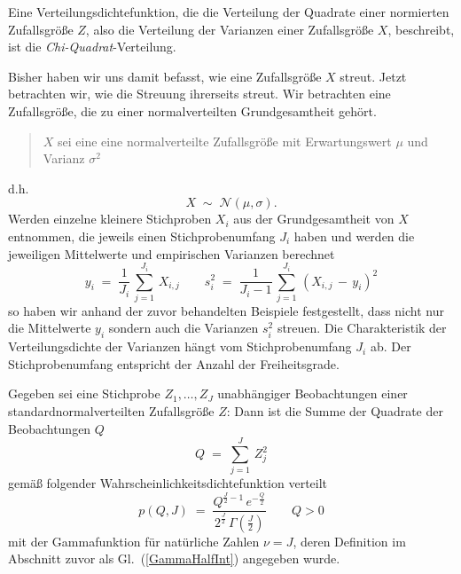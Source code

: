 Eine Verteilungsdichtefunktion, die die Verteilung der Quadrate einer
 normierten Zufallsgröße $Z$,
also die Verteilung der Varianzen einer Zufallsgröße $X$, beschreibt, ist die 
\textsl{Chi-Quadrat}-Verteilung.


Bisher haben wir uns damit befasst, wie eine Zufallsgröße $X$ streut.
Jetzt betrachten wir, wie die Streuung ihrerseits streut.
Wir betrachten eine Zufallsgröße, die zu einer normalverteilten Grundgesamtheit gehört.
\begin{quote}
$X$ sei eine eine normalverteilte Zufallsgröße mit Erwartungswert $\mu$ und Varianz $\sigma^2$
\end{quote}
d.h.
\begin{equation}
X \; \sim \; \mathcal{N}(\mu, \sigma).
\end{equation}
Werden einzelne kleinere Stichproben $X_i$ aus der Grundgesamtheit von $X$ entnommen, die
jeweils einen Stichprobenumfang $J_i$ haben und werden die jeweiligen Mittelwerte und
empirischen Varianzen berechnet
\begin{equation}
y_i \; = \; \frac{1}{J_i} \, \sum_{j=1}^{J_i} \, X_{i,j} \qquad
 s_i^2 \; = \; \frac{1}{J_i-1} \, \sum_{j=1}^{J_i} \, (X_{i,j} \, - \, y_i)^2
\end{equation}
so haben wir anhand der zuvor behandelten Beispiele festgestellt,
dass nicht nur die Mittelwerte $y_i$ sondern auch die Varianzen $s_i^2$ streuen.
Die Charakteristik der Verteilungsdichte der Varianzen hängt vom
Stichprobenumfang $J_i$ ab. Der Stichprobenumfang entspricht der Anzahl der Freiheitsgrade.

Gegeben sei eine Stichprobe $Z_1, \dots, Z_J$ unabhängiger Beobachtungen einer
standardnormalverteilten Zufallsgröße $Z$:
Dann ist die Summe der Quadrate der Beobachtungen $Q$ 
\begin{equation}
Q \; = \; \sum_{j=1}^J \, Z_j^2
\end{equation}
gemäß folgender Wahrscheinlichkeitsdichtefunktion verteilt
\begin{equation}
p(Q, J) \; = \; \frac{Q^{\frac{J}{2} - 1} \,
 e^{-\frac{Q}{2}}}{2^{\frac{J}{2}} \, \Gamma(\frac{J}{2})} \qquad Q > 0
\label{Chi2pdf}
\end{equation}
mit der Gammafunktion für natürliche Zahlen $\nu = J$, deren Definition im Abschnitt zuvor
als Gl.~(\ref{GammaHalfInt}) angegeben wurde.

